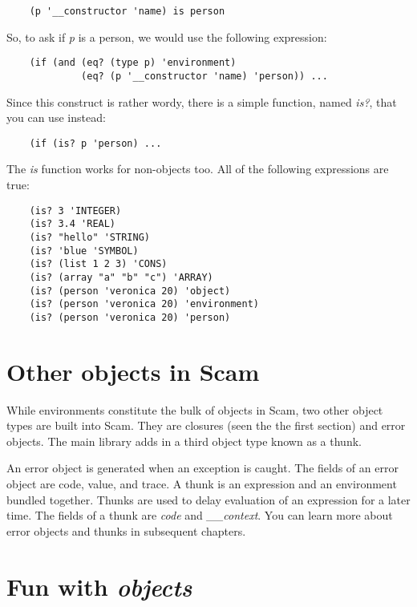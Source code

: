 \begin{verbatim}
    (p '__constructor 'name) is person
\end{verbatim}

So, to ask if {\it p} is a person, we would use the following
expression:

\begin{verbatim}
    (if (and (eq? (type p) 'environment)
             (eq? (p '__constructor 'name) 'person)) ...
\end{verbatim}

Since this construct is rather wordy, there
is a simple function, named {\it is?}, that you can use instead:

\begin{verbatim}
    (if (is? p 'person) ...
\end{verbatim}

The {\it is} function works for non-objects too. All of the following
expressions are true:

\begin{verbatim}
    (is? 3 'INTEGER)
    (is? 3.4 'REAL)
    (is? "hello" 'STRING)
    (is? 'blue 'SYMBOL)
    (is? (list 1 2 3) 'CONS)
    (is? (array "a" "b" "c") 'ARRAY)
    (is? (person 'veronica 20) 'object)
    (is? (person 'veronica 20) 'environment)
    (is? (person 'veronica 20) 'person)
\end{verbatim}

\section{Other objects in Scam}

While environments constitute the bulk of objects in
Scam, two other object types are built into Scam. They are closures
(seen the the first section) and error objects. The
main library adds in a third object type known as a thunk.

An error object is generated when an exception is caught.
The fields of an error object are code, value, and trace.
A thunk is an expression and an environment bundled
together. Thunks are used to delay evaluation of
an expression for a later time. The fields of a thunk
are {\it code} and {\it \_\_context}.
You can learn more about error objects and thunks
in subsequent chapters.

\section{Fun with {\it objects}}


